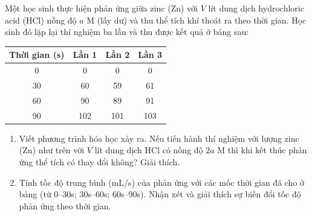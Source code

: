 \begin{tuluyen}
Một học sinh thực hiện phản ứng giữa zinc (Zn) với $V$ lít dung dịch hydrochloric acid (HCl) nồng độ $a$ M (lấy dư) và thu thể tích khí thoát ra theo thời gian. Học sinh đó lặp lại thí nghiệm ba lần và thu được kết quả ở bảng sau:
\begin{center}
\begin{tabular}{c|ccc}
\toprule
Thời gian (s) & Lần 1 & Lần 2 & Lần 3\\
\midrule
0  & 0   & 0   & 0\\
30 & 60  & 59  & 61\\
60 & 90  & 89  & 91\\
90 & 102 & 101 & 103\\
\bottomrule
\end{tabular}
\end{center}
\begin{enumerate}
\item Viết phương trình hóa học xảy ra. Nếu tiến hành thí nghiệm với lượng zinc (Zn) như trên với $V$ lít dung dịch HCl có nồng độ 2$a$ M thì khi kết thúc phản ứng thể tích  có thay đổi không? Giải thích.
\item Tính tốc độ trung bình (mL/s) của phản ứng với các mốc thời gian đã cho ở bảng (từ 0--30s; 30s--60s; 60s--90s). Nhận xét và giải thích sự biến đổi tốc độ phản ứng theo thời gian.
\end{enumerate}

\end{tuluyen}
